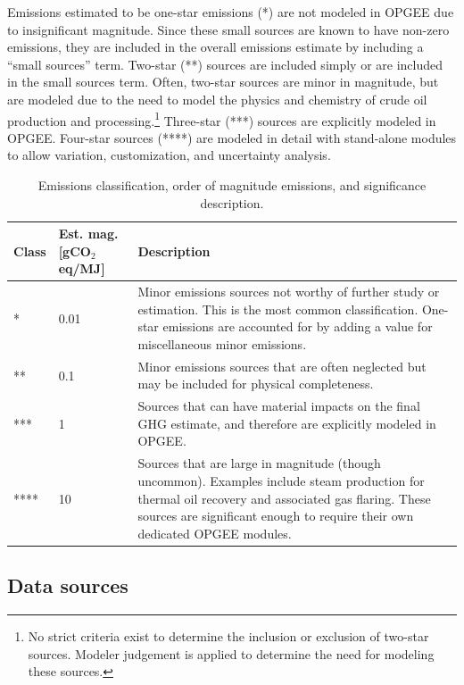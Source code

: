 \documentclass[11pt]{report}
\begin{document}
Emissions estimated to be one-star emissions (*) are not modeled in OPGEE due to insignificant magnitude. Since these small sources are known to have non-zero emissions, they are included in the overall emissions estimate by including a ``small sources'' term.  Two-star (**) sources are included simply or are included in the small sources term. Often, two-star sources are minor in magnitude, but are modeled due to the need to model the physics and chemistry of crude oil production and processing.\footnote{No strict criteria exist to determine the inclusion or exclusion of two-star sources. Modeler judgement is applied to determine the need for modeling these sources.} Three-star (***) sources are explicitly modeled in OPGEE. Four-star sources (****) are modeled in detail with stand-alone modules to allow variation, customization, and uncertainty analysis. 

\begin{table}
\begin{scriptsize}
\caption{Emissions classification, order of magnitude emissions, and significance description.}
\label{tab:emissions_significance}
\begin{tabular}{p{}p{}p{}}
\toprule
Class & Est. mag. [gCO$_2$eq/MJ] & Description \\
\midrule
* & 0.01 & Minor emissions sources not worthy of further study or estimation. This is the most common classification. One-star emissions are accounted for by adding a value for miscellaneous minor emissions.\\
** & 0.1 & Minor emissions sources that are often neglected but may be included for physical completeness.\\
*** & 1 & Sources that can have material impacts on the final GHG estimate, and therefore are explicitly modeled in OPGEE. \\
**** & 10 & Sources that are large in magnitude (though uncommon). Examples include steam production for thermal oil recovery and associated gas flaring. These sources are significant enough to require their own dedicated OPGEE modules.\\
\bottomrule 
\end{tabular}
\end{scriptsize}
\end{table}


\subsection{Data sources}
\end{document}
